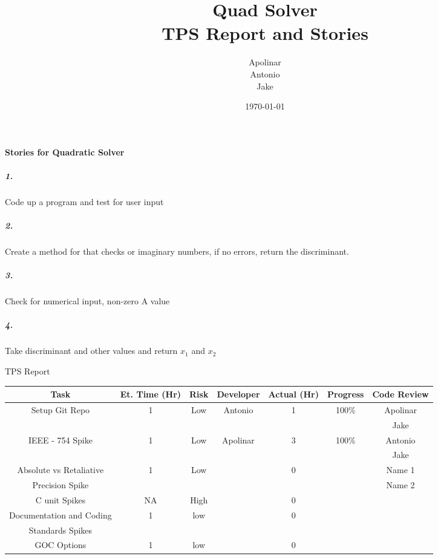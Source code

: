 \documentclass{article}
\title{Quad Solver\\TPS Report and Stories}
\date{\today}
\author{Apolinar	\\	Antonio	\\	Jake}
\begin{document}
\maketitle

\newpage



\paragraph{Stories for Quadratic Solver}
	\subparagraph{1.} Code up a program and test for user input
	
	\subparagraph{2.} Create a method for that checks or imaginary numbers, if no errors, return the discriminant.
	
	\subparagraph{3.} Check for numerical input, non-zero A value
	
	\subparagraph{4.} Take discriminant and other values and return $x_1$ and $x_2$
	
	
	
\newpage

\begin{center} TPS Report
	\begin{tabular}{|c|c|c|c|c|c|c|} \hline
	Task	&	Et. Time (Hr)	&	Risk	&	Developer	&	Actual (Hr)	&	Progress	&	Code Review	\\	\hline
	\multirow{2}{*}{Setup Git Repo}	&	\multirow{2}{*}{1}	&	\multirow{2}{*}{Low}	&	\multirow{2}{*}{Antonio}	&	\multirow{2}{*}{1}	& \multirow{2}{*}{100\%}	& Apolinar	\\
	&&&&&& Jake	\\\hline
	\multirow{2}{*}{IEEE - 754 Spike}	&	\multirow{2}{*}{1}	&	\multirow{2}{*}{Low}	&	\multirow{2}{*}{Apolinar}	&	\multirow{2}{*}{3}	& \multirow{2}{*}{100\%}	& Antonio	\\
	&&&&&& Jake	\\\hline
	Absolute vs Retaliative 	&	\multirow{2}{*}{1}	&	\multirow{2}{*}{Low}&		&	\multirow{2}{*}{0}	&		&	Name 1		\\ 
	Precision Spike&&&&&& Name 2	\\\hline
	\multirow{2}{*}{C unit Spikes}	&	\multirow{2}{*}{NA}	&	\multirow{2}{*}{High}	&		&	\multirow{2}{*}{0}	&		&		\\
	&&&&&&\\\hline
	Documentation and Coding &	\multirow{2}{*}{1}	&	\multirow{2}{*}{low}	&		&	\multirow{2}{*}{0}	&		&		\\ 
	Standards Spikes&&&&&&	\\\hline
	GOC Options	&	1	&	low	&		&	0	&		&		\\\hline
	
	\end{tabular}
\end{center}
\end{document}
